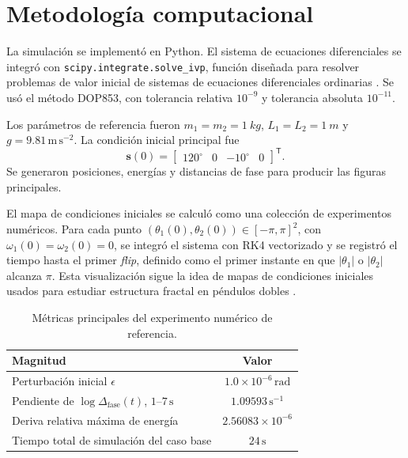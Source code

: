 \documentclass[reprint,amsmath,amssymb,aps,pra,nofootinbib,floatfix,showkeys]{revtex4-2}
\newcommand{\SIorNum}[2]{\SI{#1}{#2}}
\newcommand{\SIorNum}[2]{##1\,\mathrm{##2}}
\newcommand{\vect}[1]{\bm{#1}}
\newcommand{\Deltafase}{\Delta_{\mathrm{fase}}}
\begin{document}
\section{Metodolog\'ia computacional}

La simulaci\'on se implement\'o en Python. El sistema de ecuaciones diferenciales se integr\'o con \texttt{scipy.integrate.solve\_ivp}, funci\'on dise\~nada para resolver problemas de valor inicial de sistemas de ecuaciones diferenciales ordinarias \cite{scipy_solve_ivp}. Se us\'o el m\'etodo DOP853, con tolerancia relativa $10^{-9}$ y tolerancia absoluta $10^{-11}$.

Los par\'ametros de referencia fueron $m_1=m_2=\SIorNum{1}{kg}$, $L_1=L_2=\SIorNum{1}{m}$ y $g=9.81\,\mathrm{m\,s^{-2}}$. La condici\'on inicial principal fue
\begin{equation}
    \vect{s}(0)=
    \begin{bmatrix}
    120^\circ & 0 & -10^\circ & 0
    \end{bmatrix}^{\mathsf{T}}.
    \label{eq:initial-condition}
\end{equation}
Se generaron posiciones, energ\'ias y distancias de fase para producir las figuras principales.

El mapa de condiciones iniciales se calcul\'o como una colecci\'on de experimentos num\'ericos. Para cada punto $(\theta_1(0),\theta_2(0))\in[-\pi,\pi]^2$, con $\omega_1(0)=\omega_2(0)=0$, se integr\'o el sistema con RK4 vectorizado y se registr\'o el tiempo hasta el primer \emph{flip}, definido como el primer instante en que $|\theta_1|$ o $|\theta_2|$ alcanza $\pi$. Esta visualizaci\'on sigue la idea de mapas de condiciones iniciales usados para estudiar estructura fractal en p\'endulos dobles \cite{heyl2008double,reusser_double_pendulum}.

\begin{table}[b]
\caption{M\'etricas principales del experimento num\'erico de referencia.}
\label{tab:metrics}
\begin{ruledtabular}
\begin{tabular}{lc}
Magnitud & Valor \\
\hline
Perturbaci\'on inicial $\epsilon$ & $1.0\times10^{-6}\,\mathrm{rad}$ \\
Pendiente de $\log\Deltafase(t)$, $1$--$7\,\mathrm{s}$ & $1.09593\,\mathrm{s^{-1}}$ \\
Deriva relativa m\'axima de energ\'ia & $2.56083\times10^{-6}$ \\
Tiempo total de simulaci\'on del caso base & $24\,\mathrm{s}$ \\
\end{tabular}
\end{ruledtabular}
\end{table}
\end{document}
